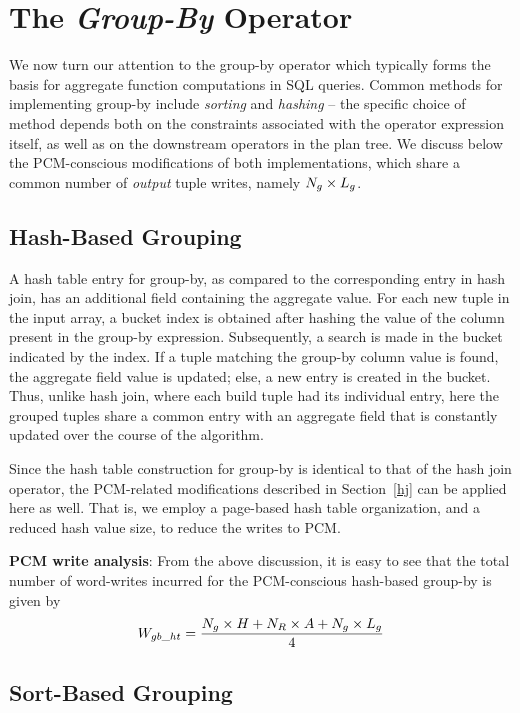\section{The \emph{Group-By} Operator}%
\label{gby}
We now turn our attention to the group-by operator which typically
forms the basis for aggregate function computations in SQL queries.
Common methods for implementing group-by include \textit{sorting} and
\textit{hashing} -- the specific choice of method depends both on the
constraints associated with the operator expression itself, as well as
on the downstream operators in the plan tree. We discuss below the
PCM-conscious modifications of both implementations, which share
a common number of \emph{output} tuple writes, namely $N_g \times L_g$.

\subsection{Hash-Based Grouping}

A hash table entry for group-by, as compared to the corresponding
entry in hash join, has an additional field containing the aggregate
value. For each new tuple in the input array, a bucket index is
obtained after hashing the value of the column present in the group-by
expression. Subsequently, a search is made in the bucket indicated by
the index. If a tuple matching the group-by column value is found, the
aggregate field value is updated; else, a new entry is created in the
bucket. Thus, unlike hash join, where each build tuple had its individual
entry, here the grouped tuples share a common entry with an aggregate
field that is constantly updated over the course of the algorithm.

Since the hash table construction for group-by is identical to that
of the hash join operator, the PCM-related modifications described
in Section~\ref{hj} can be applied here as well. That is, we employ
a page-based hash table organization, and a reduced hash value size,
to reduce the writes to PCM.

\textbf{PCM write analysis}: From the above discussion, it is easy to see
that the total number of word-writes incurred for the PCM-conscious hash-based group-by is given by
\begin{equation}
\label{eq:gb_ht}
W_{gb\_ht} = \frac {N_g \times H + 
N_R \times A + N_g \times L_g}{4}
\end{equation}

\subsection{Sort-Based Grouping}

